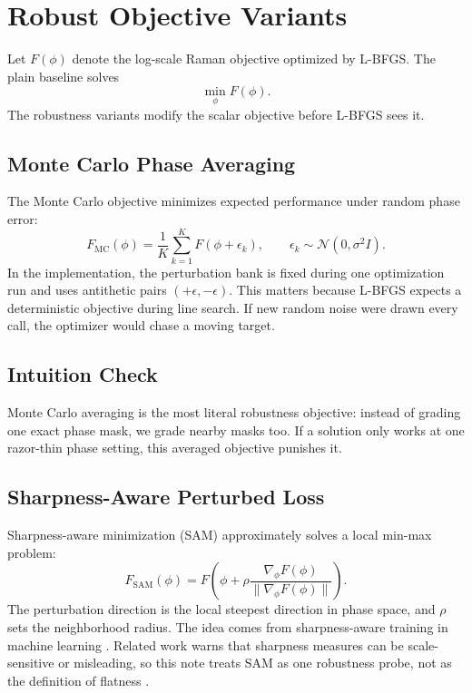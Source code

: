 \documentclass[11pt]{article}
\begin{document}
\section{Robust Objective Variants}

Let \(F(\phi)\) denote the log-scale Raman objective optimized by L-BFGS. The
plain baseline solves
\[
    \min_\phi F(\phi).
\]
The robustness variants modify the scalar objective before L-BFGS sees it.

\subsection{Monte Carlo Phase Averaging}

The Monte Carlo objective minimizes expected performance under random phase
error:
\[
    F_{\mathrm{MC}}(\phi)
    =
    \frac{1}{K}
    \sum_{k=1}^{K}
    F(\phi+\epsilon_k),
    \qquad
    \epsilon_k\sim\mathcal{N}(0,\sigma^2 I).
\]
In the implementation, the perturbation bank is fixed during one optimization
run and uses antithetic pairs \((+\epsilon,-\epsilon)\). This matters because
L-BFGS expects a deterministic objective during line search. If new random
noise were drawn every call, the optimizer would chase a moving target.

\subsection*{Intuition Check}

Monte Carlo averaging is the most literal robustness objective: instead of
grading one exact phase mask, we grade nearby masks too. If a solution only
works at one razor-thin phase setting, this averaged objective punishes it.

\subsection{Sharpness-Aware Perturbed Loss}

Sharpness-aware minimization (SAM) approximately solves a local min-max
problem:
\[
    F_{\mathrm{SAM}}(\phi)
    =
    F\!\left(\phi+\rho
    \frac{\nabla_\phi F(\phi)}{\|\nabla_\phi F(\phi)\|}
    \right).
\]
The perturbation direction is the local steepest direction in phase space, and
\(\rho\) sets the neighborhood radius. The idea comes from sharpness-aware
training in machine learning \cite{foret2021}. Related work warns that
sharpness measures can be scale-sensitive or misleading, so this note treats
SAM as one robustness probe, not as the definition of flatness
\cite{kwon2021,zhuang2022}.
\end{document}
